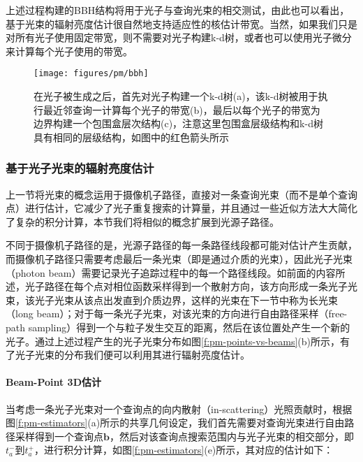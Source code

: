 上述过程构建的BBH结构将用于光子与查询光束的相交测试，由此也可以看出，基于光束的辐射亮度估计很自然地支持适应性的核估计带宽。当然，如果我们只是对所有光子使用固定带宽，则不需要对光子构建k-d树，或者也可以使用光子微分来计算每个光子使用的带宽。

\begin{figure}
	\texttt{[image: figures/pm/bbh]}
	\caption{在光子被生成之后，首先对光子构建一个k-d树(a)，该k-d树被用于执行最近邻查询一计算每个光子的带宽(b)，最后以每个光子的带宽为边界构建一个包围盒层次结构(c)，注意这里包围盒层级结构和k-d树具有相同的层级结构，如图中的红色箭头所示}
	\label{f:pm-bbh}
\end{figure}



\subsubsection{基于光子光束的辐射亮度估计}
上一节将光束的概念运用于摄像机子路径，直接对一条查询光束（而不是单个查询点）进行估计，它减少了光子重复搜索的计算量，并且通过一些近似方法大大简化了复杂的积分计算，本节我们将相似的概念扩展到光源子路径。

不同于摄像机子路径的是，光源子路径的每一条路径线段都可能对估计产生贡献，而摄像机子路径只需要考虑最后一条光束（即是通过介质的光束），因此光子光束（photon beam）需要记录光子追踪过程中的每一个路径线段。如前面的内容所述，光子路径在每个点对相位函数采样得到一个散射方向，该方向形成一条光子光束，该光子光束从该点出发直到介质边界，这样的光束在下一节中称为长光束（long beam）；对于每一条光子光束，对该光束的方向进行自由路径采样（free-path sampling）得到一个与粒子发生交互的距离，然后在该位置处产生一个新的光子。通过上述过程产生的光子光束分布如图\ref{f:pm-points-vs-beams}(b)所示，有了光子光束的分布我们便可以利用其进行辐射亮度估计。




\paragraph{Beam-Point 3D估计}
当考虑一条光子光束对一个查询点的向内散射（in-scattering）光照贡献时，根据图\ref{f:pm-estimators}(a)所示的共享几何设定，我们首先需要对查询光束进行自由路径采样得到一个查询点$\mathbf{b}$，然后对该查询点搜索范围内与光子光束的相交部分，即$t^{-}_a$到$t^{+}_a$，进行积分计算，如图\ref{f:pm-estimators}(e)所示，其对应的估计如下：

